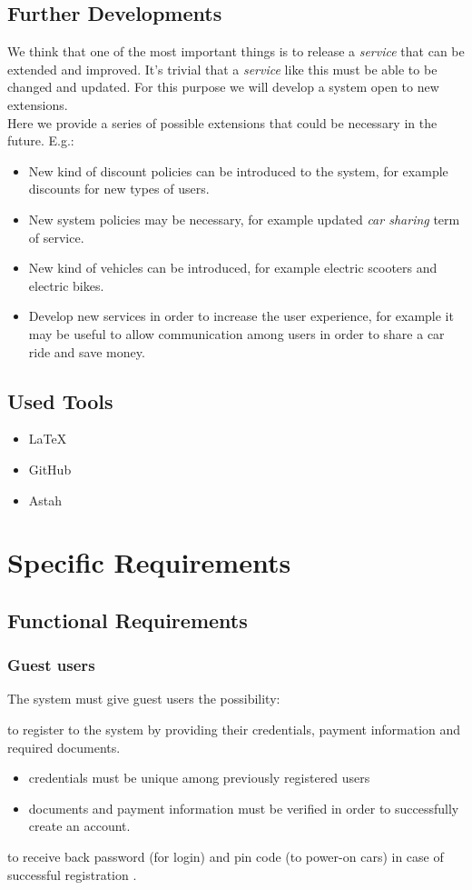 \documentclass[english]{article}
\newcommand{\carsharing}{\textit {car sharing }}
\newcommand{\service}{\textit{service }}
\newcounter{reqId}
\newenvironment{requirementsgroup}
		{
			\newcommand{\req}[1]{ 
				\stepcounter{reqId} 
				\hypertarget{R\arabic{reqId}}{
					\item[
						 R.\arabic{reqId}
					]{ ##1 }
				}
			}
			\begin{description}
		}
		{
			\end{description}
		}
\begin{document}
\subsection{Further Developments}
	We think that one of the most important things is to release a \service that can be extended and improved. It's trivial that a \service like this must be able to be changed and updated.
	For this purpose we will develop a system open to new extensions. \\
	Here we provide a series of possible extensions that could be necessary in the future.
	E.g.:
	\begin{itemize}
		\item New kind of discount policies can be introduced to the system, for example discounts for new types of users. 
		\item New system policies may be necessary, for example updated \carsharing term of service.
		\item New kind of vehicles can be introduced, for example electric scooters and electric bikes.
		\item Develop new services in order to increase the user experience, for example it may be useful to allow communication among users in order to share a car ride and save money.
	\end{itemize}
	\subsection{Used Tools}
	\begin{itemize}
		\item \LaTeX\\
		\item GitHub\\
		\item Astah\\
	\end{itemize}
\section{Specific Requirements}
	\subsection{Functional Requirements}
	
	\subsubsection{Guest users}
	The system must give guest users the possibility:
	\begin{requirementsgroup}
		\req{ to register to the system by providing their credentials, payment information and required documents.
			\begin{itemize}
				\item{credentials must be unique among previously registered users }
				\item{documents and payment information must be verified in order to successfully create an account.}
			\end{itemize}
		 }
		\req{ to receive back password (for login) and pin code (to power-on cars) in case of successful registration . }
	\end{requirementsgroup}	
		
\end{document}
